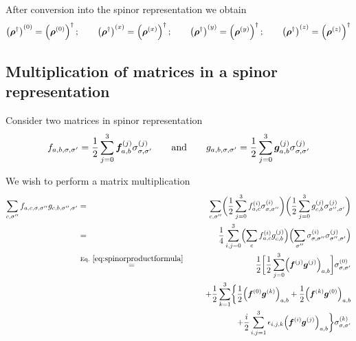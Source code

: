 \documentclass[11pt,a4paper]{report}
\begin{document}
After conversion into the spinor representation we obtain
\begin{eqnarray}
\left(\bm{\rho}^\dagger\right)^{(0)}=\left(\bm{\rho}^{(0)}\right)^\dagger
;\qquad
\left(\bm{\rho}^\dagger\right)^{(x)}=\left(\bm{\rho}^{(x)}\right)^\dagger
;\qquad
\left(\bm{\rho}^\dagger\right)^{(y)}=\left(\bm{\rho}^{(y)}\right)^\dagger
;\qquad
\left(\bm{\rho}^\dagger\right)^{(z)}=\left(\bm{\rho}^{(z)}\right)^\dagger
\nonumber\\
\end{eqnarray}

\subsection{Multiplication of matrices in a spinor representation}
Consider two matrices in spinor representation
\begin{eqnarray*}
f_{a,b,\sigma,\sigma'}=\frac{1}{2}\sum_{j=0}^3
\bm{f}^{(j)}_{a,b}\sigma^{(j)}_{\sigma,\sigma'}
\qquad\text{and}\qquad
g_{a,b,\sigma,\sigma'}=\frac{1}{2}\sum_{j=0}^3
\bm{g}^{(j)}_{a,b}\sigma^{(j)}_{\sigma,\sigma'}
\end{eqnarray*}

We wish to perform a matrix multiplication
\begin{eqnarray*}
\sum_{c,\sigma''}
f_{a,c,\sigma,\sigma''}g_{c,b,\sigma'',\sigma'}
&=&
\sum_{c,\sigma''}
\biggl(\frac{1}{2}\sum_{j=0}^3
f^{(i)}_{a,c}\sigma^{(i)}_{\sigma,\sigma''}\biggr)
\biggl(\frac{1}{2}\sum_{j=0}^3
g^{(j)}_{c,b}\sigma^{(j)}_{\sigma'',\sigma'}\biggr)
\nonumber\\
&=&
\frac{1}{4}\sum_{i,j=0}^3
\Bigl(\sum_{c}
f^{(i)}_{a,c}g^{(j)}_{c,b}\Bigr)
\Bigl(\sum_{\sigma''}
\sigma^{(i)}_{\sigma,\sigma''}
\sigma^{(j)}_{\sigma'',\sigma'}\Bigr)
\nonumber\\
&\eqrel{eq:spinorproductformula}{=}&
\frac{1}{2}
\biggl[\frac{1}{2}\sum_{j=0}^3
\Bigl(\mat{f}^{(j)}\mat{g}^{(j)}\Bigr)_{a,b}\biggr]
\sigma^{(0)}_{\sigma,\sigma'}
\nonumber\\
&&+\frac{1}{2}\sum_{k=1}^3
\biggl\lbrace\frac{1}{2}\Bigl(\mat{f}^{(0)}\mat{g}^{(k)}\Bigr)_{a,b}
+\frac{1}{2}\Bigl(\mat{f}^{(k)}\mat{g}^{(0)}\Bigr)_{a,b}
\nonumber\\
&&\hspace{2cm}
+\frac{i}{2}\sum_{i,j=1}^3\epsilon_{i,j,k}\Bigl(\mat{f}^{(i)}\mat{g}^{(j)}\Bigr)_{a,b}
\biggr\rbrace
\sigma^{(k)}_{\sigma,\sigma'}
\end{eqnarray*}
\end{document}
